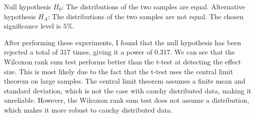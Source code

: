 \documentclass[a4paper]{article}
\begin{document}
Null hypothesis $H_0$: The distributions of the two samples are equal.\newline
Alternative hypothesis $H_A$: The distributions of the two samples are not equal.\newline
The chosen significance level is $5\%$.
After performing these experiments, I found that the null hypothesis has been rejected a total of 317 times, giving it a power of 0.317. We can see that the Wilcoxon rank sum test performs better than the t-test at detecting the effect size. This is most likely due to the fact that the t-test uses the central limit theorem on large samples. The central limit theorem assumes a finite mean and standard deviation, which is not the case with cauchy distributed data, making it unreliable. However, the Wilcoxon rank sum test does not assume a distribution, which makes it more robust to cauchy distributed data.
\end{document}
